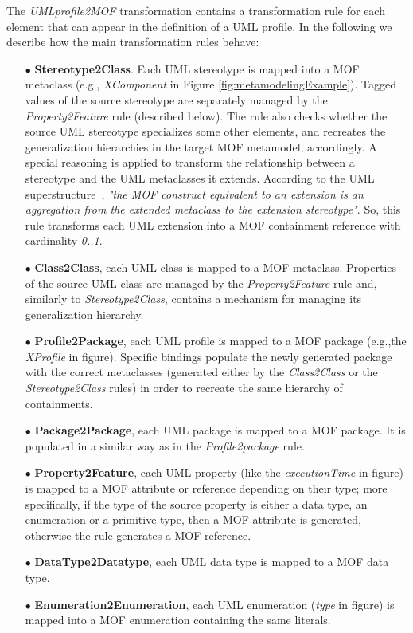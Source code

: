 %
The \textit{UMLprofile2MOF} transformation contains a transformation rule for each element that can appear in the definition of a UML profile. In the following we describe how the main transformation rules behave:
\begin{itemize}
	\item[$\bullet$] \textbf{Stereotype2Class}. Each UML stereotype is mapped into a MOF metaclass
	(e.g., \textit{XComponent} in Figure \ref{fig:metamodelingExample}).  		
	Tagged values of the source stereotype are separately managed by the \textit{Property2Feature} rule (described below).
	The rule also checks whether the source UML stereotype specializes some other elements, and recreates the generalization hierarchies in the target MOF metamodel, accordingly.
	A special reasoning is applied to transform the relationship between a stereotype and the UML metaclasses it extends.
	According to the UML superstructure~\cite{UML}, \textit{"the MOF construct equivalent to an extension is an aggregation from
	the extended metaclass to the extension stereotype"}. So, this rule transforms each UML extension into
	a MOF containment reference with cardinality \textit{0..1}. 	
	\item[$\bullet$] \textbf{Class2Class}, each UML class is mapped to a MOF metaclass.
	Properties of the source UML class are managed by the \textit{Property2Feature} rule and, similarly to \textit{Stereotype2Class},
	contains a mechanism for managing its generalization hierarchy.
	\item[$\bullet$] \textbf{Profile2Package}, each UML profile is mapped to a MOF package (e.g.,the \textit{ XProfile} in figure). Specific bindings populate the newly generated package with the correct metaclasses (generated either by the \textit{Class2Class} or the \textit{Stereotype2Class} rules) in order to recreate the same hierarchy of containments.
	\item[$\bullet$] \textbf{Package2Package}, each UML package is mapped to a MOF package. It is populated in a similar way as in the \textit{Profile2package} rule.
	\item[$\bullet$] \textbf{Property2Feature}, each UML property (like the \textit{executionTime} in figure)
	is mapped to a MOF attribute or reference depending on their type;
	more specifically, if the type of the source property is either a data type, an enumeration or a primitive type,
	then a MOF attribute is generated, otherwise the rule generates a MOF reference.
	\item[$\bullet$] \textbf{DataType2Datatype}, each UML data type is mapped to a MOF data type.
	\item[$\bullet$] \textbf{Enumeration2Enumeration}, each UML enumeration (\textit{type} in figure)
	is mapped into a MOF enumeration containing the same literals.
\end{itemize}
